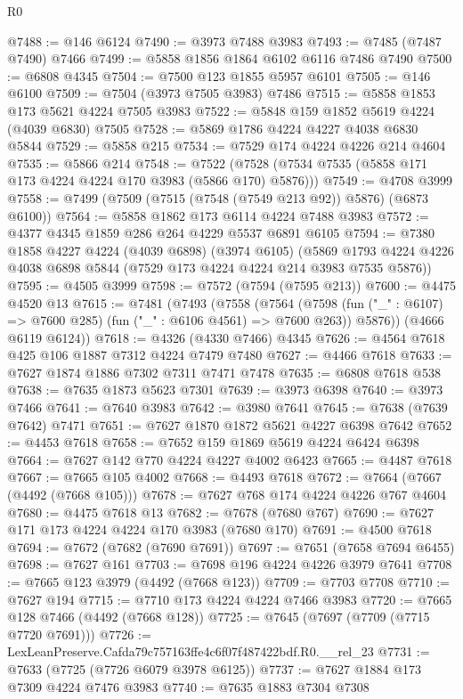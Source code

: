 \begin{lexlean}{R0}
\begin{coremodule}
@7488 := @146 @6124
@7490 := @3973 @7488 @3983
@7493 := @7485 (@7487 @7490) @7466
@7499 := @5858 @1856 @1864 @6102 @6116 @7486 @7490
@7500 := @6808 @4345
@7504 := @7500 @123 @1855 @5957 @6101
@7505 := @146 @6100
@7509 := @7504 (@3973 @7505 @3983) @7486
@7515 := @5858 @1853 @173 @5621 @4224 @7505 @3983
@7522 := @5848 @159 @1852 @5619 @4224 (@4039 @6830) @7505
@7528 := @5869 @1786 @4224 @4227 @4038 @6830 @5844
@7529 := @5858 @215
@7534 := @7529 @174 @4224 @4226 @214 @4604
@7535 := @5866 @214
@7548 := @7522 (@7528 (@7534 @7535 (@5858 @171 @173 @4224 @4224 @170 @3983 (@5866 @170) @5876)))
@7549 := @4708 @3999
@7558 := @7499 (@7509 (@7515 (@7548 (@7549 @213 @92)) @5876) (@6873 @6100))
@7564 := @5858 @1862 @173 @6114 @4224 @7488 @3983
@7572 := @4377 @4345 @1859 @286 @264 @4229 @5537 @6891 @6105
@7594 := @7380
    @1858
    @4227
    @4224
    (@4039 @6898)
    (@3974 @6105)
    (@5869 @1793 @4224 @4226 @4038 @6898 @5844 (@7529 @173 @4224 @4224 @214 @3983 @7535 @5876))
@7595 := @4505 @3999
@7598 := @7572 (@7594 (@7595 @213))
@7600 := @4475 @4520 @13
@7615 := @7481
    (@7493
      (@7558
        (@7564
          (@7598 (fun ("_" : @6107) => @7600 @285) (fun ("_" : @6106 @4561) => @7600 @263))
          @5876))
      (@4666 @6119 @6124))
@7618 := @4326 (@4330 @7466) @4345
@7626 := @4564 @7618 @425 @106 @1887 @7312 @4224 @7479 @7480
@7627 := @4466 @7618
@7633 := @7627 @1874 @1886 @7302 @7311 @7471 @7478
@7635 := @6808 @7618 @538
@7638 := @7635 @1873 @5623 @7301
@7639 := @3973 @6398
@7640 := @3973 @7466
@7641 := @7640 @3983
@7642 := @3980 @7641
@7645 := @7638 (@7639 @7642) @7471
@7651 := @7627 @1870 @1872 @5621 @4227 @6398 @7642
@7652 := @4453 @7618
@7658 := @7652 @159 @1869 @5619 @4224 @6424 @6398
@7664 := @7627 @142 @770 @4224 @4227 @4002 @6423
@7665 := @4487 @7618
@7667 := @7665 @105 @4002
@7668 := @4493 @7618
@7672 := @7664 (@7667 (@4492 (@7668 @105)))
@7678 := @7627 @768 @174 @4224 @4226 @767 @4604
@7680 := @4475 @7618 @13
@7682 := @7678 (@7680 @767)
@7690 := @7627 @171 @173 @4224 @4224 @170 @3983 (@7680 @170)
@7691 := @4500 @7618
@7694 := @7672 (@7682 (@7690 @7691))
@7697 := @7651 (@7658 @7694 @6455)
@7698 := @7627 @161
@7703 := @7698 @196 @4224 @4226 @3979 @7641
@7708 := @7665 @123 @3979 (@4492 (@7668 @123))
@7709 := @7703 @7708
@7710 := @7627 @194
@7715 := @7710 @173 @4224 @4224 @7466 @3983
@7720 := @7665 @128 @7466 (@4492 (@7668 @128))
@7725 := @7645 (@7697 (@7709 (@7715 @7720 @7691)))
@7726 := LexLeanPreserve.Cafda79c757163ffe4c6f07f487422bdf.R0.__rel_23
@7731 := @7633 (@7725 (@7726 @6079 @3978 @6125))
@7737 := @7627 @1884 @173 @7309 @4224 @7476 @3983
@7740 := @7635 @1883 @7304 @7308

\end{coremodule}
\end{lexlean}
